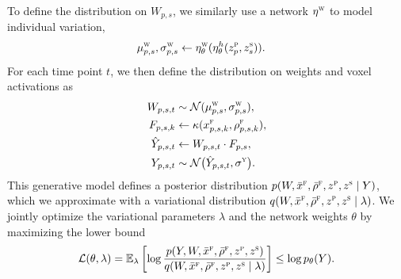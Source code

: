 \documentclass{article}
\newcommand{\scf}{\textsc{f}}
\newcommand{\scw}{\textsc{w}}
\newcommand{\scp}{\textsc{p}}
\newcommand{\scs}{\textsc{s}}
\begin{document}
To define the distribution on $W_{p,s}$, we similarly use a network $\eta^\scw$ to model individual variation,
\begin{align}
    \mu_{p,s}^\scw, \sigma_{p,s}^\scw &\leftarrow \eta^\scw_\theta(\eta^h_\theta(z_p^\scp, z_s^\scs)).
\end{align}
For each time point $t$, we then define the distribution on weights and voxel activations as
\begin{align}
    W_{p,s,t} &\sim \mathcal{N}(\mu_{p,s}^\scw, \sigma_{p,s}^\scw),
    \\
    F_{p,s,k} &\gets \kappa(x^\scf_{p,s,k}, \rho^\scf_{p,s,k}),
    \\
    \hat{Y}_{p,s,t} &\gets W_{p,s,t} \cdot F_{p,s},
    \\
    Y_{p,s,t} &\sim \mathcal{N}\big( \hat{Y}_{p,s,t}, \sigma^\textsc{y}\big).
\end{align}
This generative model defines a posterior distribution $p(W,\bar{x}^\scf,\bar{\rho}^\scf,z^\scp,z^\scs \mid Y)$, which we approximate with a variational distribution $q(W,\bar{x}^\scf,\bar{\rho}^\scf,z^\scp,z^\scs \mid \lambda)$. We jointly optimize the variational parameters $\lambda$ and the network weights $\theta$ by maximizing the lower bound
\begin{align*}
    \mathcal{L}(\theta, \lambda)
    = 
    \mathbb{E}_\lambda
    \left[
    \log 
    \frac{p(Y, W,\bar{x}^\scf,\bar{\rho}^\scf,z^\scp,z^\scs)}
         {q(W,\bar{x}^\scf,\bar{\rho}^\scf,z^\scp,z^\scs \mid \lambda)}
    \right]
    \le 
    \log p_\theta(Y).
\end{align*}
\end{document}
